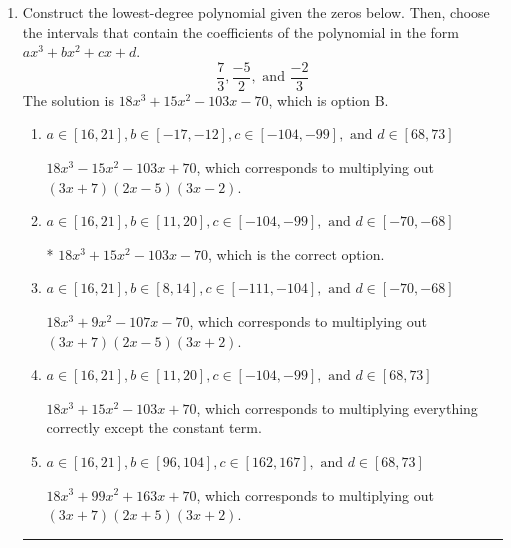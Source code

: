 \documentclass{extbook}[14pt]
\newcommand{\litem}[1]{\item #1

\rule{\textwidth}{0.4pt}}
\begin{document}
\begin{enumerate}\litem{
Construct the lowest-degree polynomial given the zeros below. Then, choose the intervals that contain the coefficients of the polynomial in the form $ax^3+bx^2+cx+d$.
\[ \frac{7}{3}, \frac{-5}{2}, \text{ and } \frac{-2}{3} \]The solution is \( 18x^{3} +15 x^{2} -103 x -70 \), which is option B.\begin{enumerate}[label=\Alph*.]
\item \( a \in [16, 21], b \in [-17, -12], c \in [-104, -99], \text{ and } d \in [68, 73] \)

$18x^{3} -15 x^{2} -103 x + 70$, which corresponds to multiplying out $(3x + 7)(2x -5)(3x -2)$.
\item \( a \in [16, 21], b \in [11, 20], c \in [-104, -99], \text{ and } d \in [-70, -68] \)

* $18x^{3} +15 x^{2} -103 x -70$, which is the correct option.
\item \( a \in [16, 21], b \in [8, 14], c \in [-111, -104], \text{ and } d \in [-70, -68] \)

$18x^{3} +9 x^{2} -107 x -70$, which corresponds to multiplying out $(3x + 7)(2x -5)(3x + 2)$.
\item \( a \in [16, 21], b \in [11, 20], c \in [-104, -99], \text{ and } d \in [68, 73] \)

$18x^{3} +15 x^{2} -103 x + 70$, which corresponds to multiplying everything correctly except the constant term.
\item \( a \in [16, 21], b \in [96, 104], c \in [162, 167], \text{ and } d \in [68, 73] \)

$18x^{3} +99 x^{2} +163 x + 70$, which corresponds to multiplying out $(3x + 7)(2x + 5)(3x + 2)$.
\end{enumerate}

}
\end{enumerate}
\end{document}
